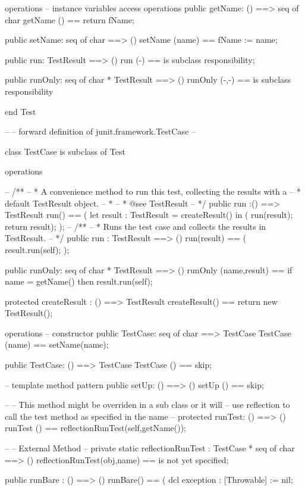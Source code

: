 \documentclass[a4paper]{article}
\begin{document}
\begin{vdm_al}
operations
  -- instance variables access operations
  public getName: () ==> seq of char
  getName () == return fName;
  
  public setName: seq of char ==> ()
  setName (name) == fName := name;
  
  public run: TestResult ==> ()
  run (-) == is subclass responsibility;
  
  public runOnly: seq of char * TestResult ==> ()
  runOnly (-,-) == is subclass responsibility
    
end Test

--
-- forward definition of junit.framework.TestCase
--

class TestCase is subclass of Test

operations

--  /**
--   * A convenience method to run this test, collecting the results with a
--   * default TestResult object.
--   *
--   * @see TestResult
--   */
    public run :() ==> TestResult
    run() ==
    (
        let result : TestResult = createResult() in (
        run(result);
        return result);
    );
--  /**
--   * Runs the test case and collects the results in TestResult.
--   */
    public run : TestResult ==> ()
    run(result) ==
    (
        result.run(self);
    );
 
 public runOnly: seq of char * TestResult ==> ()
 runOnly (name,result) ==
 if name = getName() then
  result.run(self);
  
    protected createResult : () ==> TestResult
    createResult() == return new TestResult();
 
operations
  -- constructor
  public TestCase: seq of char ==> TestCase
  TestCase (name) == setName(name);

  public TestCase: () ==> TestCase
  TestCase () == skip;
    
  -- template method pattern
  public setUp: () ==> ()
  setUp () == skip;
  
  --
  -- This method might be overriden in a sub class or it will
  --  use reflection to call the test method as specified in the name
  --
  protected runTest: () ==> ()
  runTest () == reflectionRunTest(self,getName());

  --
  -- External Method
  --
  private static reflectionRunTest : TestCase * seq of char ==> ()
  reflectionRunTest(obj,name) == is not yet specified;
     
  public runBare : () ==> ()
  runBare() ==
  (
    dcl exception : [Throwable] := nil;
    

\end{vdm_al}
\end{document}

